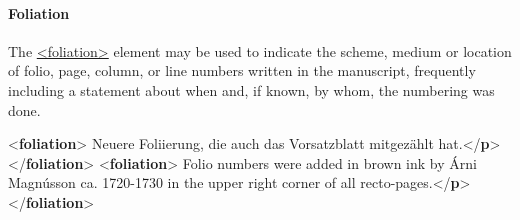 \paragraph[{Foliation}]{Foliation}\label{msphfo}\par
The \hyperref[TEI.foliation]{<foliation>} element may be used to indicate the scheme, medium or location of folio, page, column, or line numbers written in the manuscript, frequently including a statement about when and, if known, by whom, the numbering was done. \par\bgroup{}\exampleFont \begin{shaded}\noindent\mbox{}{<\textbf{foliation}>}\mbox{}\newline 
{}Neuere Foliierung, die auch das Vorsatzblatt mitgezählt\mbox{}\newline 
\hspace*{1em}\hspace*{1em} hat.{</\textbf{p}>}\mbox{}\newline 
{</\textbf{foliation}>}\mbox{}\newline 
{<\textbf{foliation}>}\mbox{}\newline 
{}Folio numbers were added in brown ink by Árni Magnússon ca.\mbox{}\newline 
\hspace*{1em}\hspace*{1em} 1720-1730 in the upper right corner of all recto-pages.{</\textbf{p}>}\mbox{}\newline 
{</\textbf{foliation}>}\end{shaded}\egroup\par \par
